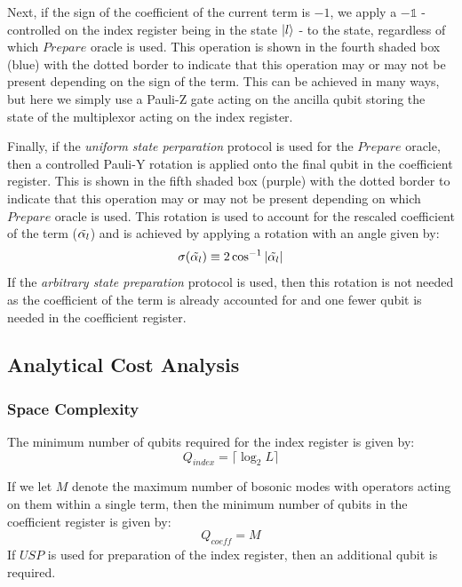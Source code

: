 Next, if the sign of the coefficient of the current term is $-1$, we apply a $- \mathds{1}$ - controlled on the index register being in the state $\ket{l}$ - to the state, regardless of which $Prepare$ oracle is used.
This operation is shown in the fourth shaded box (blue) with the dotted border to indicate that this operation may or may not be present depending on the sign of the term.
This can be achieved in many ways, but here we simply use a Pauli-Z gate acting on the ancilla qubit storing the state of the multiplexor acting on the index register.

Finally, if the \textit{uniform state perparation} protocol is used for the $Prepare$ oracle, then a controlled Pauli-Y rotation is applied onto the final qubit in the coefficient register.
This is shown in the fifth shaded box (purple) with the dotted border to indicate that this operation may or may not be present depending on which $Prepare$ oracle is used.
This rotation is used to account for the rescaled coefficient of the term ($\Tilde{\alpha_l}$) and is achieved by applying a rotation with an angle given by:
\begin{equation}
    \sigma(\Tilde{\alpha_l}) \equiv 2 \cos^{-1}{|\Tilde{\alpha_l}|}
\end{equation}
If the \textit{arbitrary state preparation} protocol is used, then this rotation is not needed as the coefficient of the term is already accounted for and one fewer qubit is needed in the coefficient register.


\subsection{Analytical Cost Analysis}
\label{subsec:analytics}


\subsubsection{Space Complexity}
\label{subsubsec:space}

The minimum number of qubits required for the index register is given by:
\begin{equation}
    Q_{\textit{index}} = \lceil \log_2{L} \rceil
\end{equation}

If we let $M$ denote the maximum number of bosonic modes with operators acting on them within a single term, then the minimum number of qubits in the coefficient register is given by:
\begin{equation}
    Q_{\textit{coeff}} = M 
\end{equation} 
If $USP$ is used for preparation of the index register, then an additional qubit is required.


